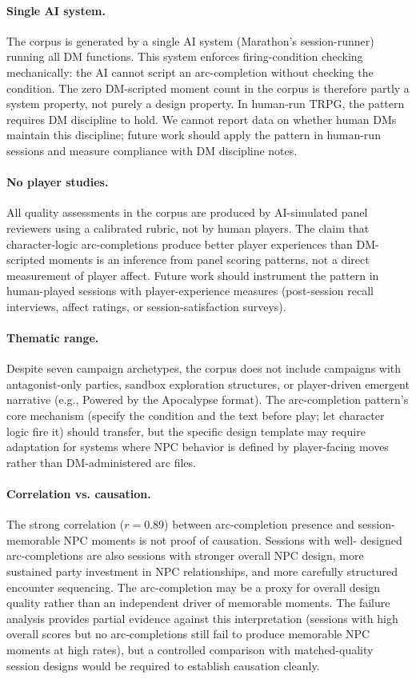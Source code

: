 \paragraph{Single AI system.}
The corpus is generated by a single AI system (Marathon's session-runner)
running all DM functions. This system enforces firing-condition checking
mechanically: the AI cannot script an arc-completion without checking the
condition. The zero DM-scripted moment count in the corpus is therefore partly
a system property, not purely a design property. In human-run TRPG, the
pattern requires DM discipline to hold. We cannot report data on whether human
DMs maintain this discipline; future work should apply the pattern in human-run
sessions and measure compliance with DM discipline notes.

\paragraph{No player studies.}
All quality assessments in the corpus are produced by AI-simulated panel
reviewers using a calibrated rubric, not by human players. The claim that
character-logic arc-completions produce better player experiences than DM-
scripted moments is an inference from panel scoring patterns, not a direct
measurement of player affect. Future work should instrument the pattern in
human-played sessions with player-experience measures (post-session recall
interviews, affect ratings, or session-satisfaction surveys).

\paragraph{Thematic range.}
Despite seven campaign archetypes, the corpus does not include campaigns with
antagonist-only parties, sandbox exploration structures, or player-driven
emergent narrative (e.g., Powered by the Apocalypse format). The arc-completion
pattern's core mechanism (specify the condition and the text before play; let
character logic fire it) should transfer, but the specific design template may
require adaptation for systems where NPC behavior is defined by player-facing
moves rather than DM-administered arc files.

\paragraph{Correlation vs. causation.}
The strong correlation ($r = 0.89$) between arc-completion presence and
session-memorable NPC moments is not proof of causation. Sessions with well-
designed arc-completions are also sessions with stronger overall NPC design,
more sustained party investment in NPC relationships, and more carefully
structured encounter sequencing. The arc-completion may be a proxy for overall
design quality rather than an independent driver of memorable moments. The
failure analysis provides partial evidence against this interpretation (sessions
with high overall scores but no arc-completions still fail to produce memorable
NPC moments at high rates), but a controlled comparison with matched-quality
session designs would be required to establish causation cleanly.
